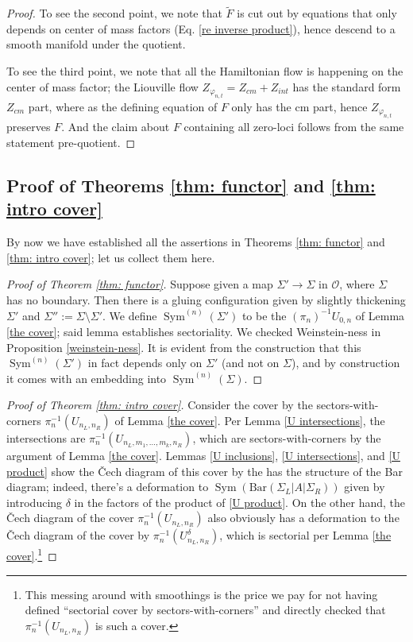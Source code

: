 \documentclass{article}
\def\wt{\widetilde}
\DeclareMathOperator{\Sym}{Sym}
\theoremstyle{definition}
\begin{document}
\begin{proof}
To see the second point,  we note that $\wt F$ is cut out by equations that only depends on center of mass factors (Eq. \eqref{re inverse product}), hence descend to a smooth manifold under the quotient. 

To see the third point, we note that all the Hamiltonian flow is happening on the center of mass factor; the Liouville flow $Z_{\varphi_{n,t}} = Z_{cm} + Z_{int}$ has the standard form $Z_{cm}$ part, where as the defining equation of $F$ only has the cm part, hence $Z_{\varphi_{n,t}}$ preserves $F$. And the claim about $F$ containing all zero-loci follows from the same statement pre-quotient. 
\end{proof}






\subsection{Proof of Theorems \ref{thm: functor} and \ref{thm: intro cover}}

By now we have established all the assertions in Theorems \ref{thm: functor} and \ref{thm: intro cover}; let us collect them here. 
  
\begin{proof}[Proof of Theorem \ref{thm: functor}]
    Suppose given a map $\Sigma' \to \Sigma$ in $\mathcal{O}$, where $\Sigma$ has no boundary.  Then there is a gluing configuration given by slightly thickening $\Sigma'$ and  $\Sigma'' := \Sigma \setminus \Sigma'$.  We define $\Sym^{(n)}(\Sigma')$ to be the $(\pi_n)^{-1} U_{0,n}$ of Lemma \ref{the cover}; said lemma establishes sectoriality.  We checked Weinstein-ness in Proposition \ref{weinstein-ness}. It is evident from the construction that this $\Sym^{(n)}(\Sigma')$ in fact depends only on $\Sigma'$ (and not on $\Sigma$), and by construction it comes with an embedding into $\Sym^{(n)}(\Sigma)$.  
\end{proof}

\begin{proof}[Proof of Theorem \ref{thm: intro cover}]
    Consider the cover by the sectors-with-corners
    $\pi_n^{-1}(U_{n_L,n_R})$ of Lemma \ref{the cover}. 
    Per Lemma \ref{U intersections}, the intersections are  $\pi_n^{-1}(U_{n_L,m_1, \ldots, m_k,n_R})$, which are sectors-with-corners by the argument of Lemma \ref{the cover}.  Lemmas \ref{U inclusions}, \ref{U intersections}, and \ref{U product} show  the \v{C}ech diagram of this cover by the  has the structure of the Bar diagram; indeed, there's a deformation to $\Sym(\mathrm{Bar}(\Sigma_L|A|\Sigma_R))$ given by introducing $\delta$ in the factors of the product of \ref{U product}.  On the other hand, the \v{C}ech diagram of the cover $\pi_n^{-1}(U_{n_L,n_R})$ also obviously has a deformation to the \v{C}ech diagram of the cover by $\pi_n^{-1}(U_{n_L,n_R}^\delta)$, which is sectorial per Lemma \ref{the cover}.\footnote{This messing around with smoothings is the price we pay for not having defined ``sectorial cover by sectors-with-corners''  and directly checked that $\pi_n^{-1}(U_{n_L,n_R})$ is such a cover.}
\end{proof}
\end{document}

